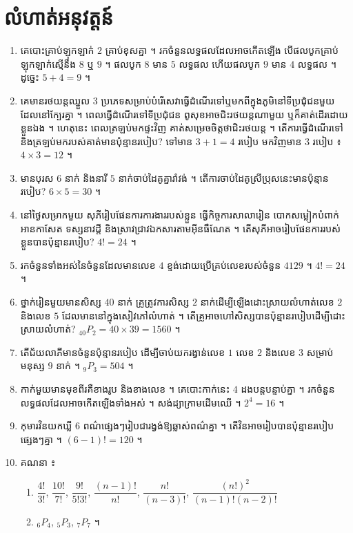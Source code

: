 \section*{លំហាត់អនុវត្តន៍}
\begin{enumerate}[1]
  \item គេបោះគ្រាប់ឡុកឡាក់ $2$ គ្រាប់ខុសគ្នា ។ រកចំនួនលទ្ធផលដែលអាចកើតឡើង បើផលបូកគ្រាប់ឡុកឡាក់ស្មើនឹង $8$ ឬ $9$ ។
  \ans
  ផលបូក $8$ មាន $5$ លទ្ធផល ហើយផលបូក $9$ មាន $4$ លទ្ធផល ។ ដូច្នេះ $5 + 4 = 9$ ។
  \item គេមានរថយន្តឈ្នួល $3$ ប្រភេទសម្រាប់បំរើសេវាធ្វើដំណើរទៅឬមកពីក្នុងភូមិនៅទីប្រជុំជនមួយដែលនៅក្បែរគ្នា ។ ពេលធ្វើដំណើរទៅទីប្រជុំជន ពូសុខអាចជិះរថយន្តណាមួយ ឬក៏គាត់ដើរដោយខ្លួនឯង ។ ហេតុនេះ ពេលត្រឡប់មកផ្ទះវិញ គាត់សម្រេចចិត្តថាជិះរថយន្ត ។ តើការធ្វើដំណើរទៅនិងត្រឡប់មករបស់គាត់មានប៉ុន្មានរបៀប?
  \ans
  ទៅមាន $3 + 1 = 4$ របៀប មកវិញមាន $3$ របៀប ៖ $4\times 3 = 12$ ។
  \item មានបុរស $6$ នាក់ និងនារី $5$ នាក់ចាប់ដៃគូគ្នារាំវង់ ។ តើការចាប់ដៃគូស្រីប្រុសនេះមានប៉ុន្មានរបៀប?
  \ans
  $6\times 5 = 30$ ។
  \item នៅថ្ងៃសម្រាកមួយ សុភីរៀបផែនការការងាររបស់ខ្លួន ធ្វើកិច្ចការសាលារៀន បោកសម្លៀកបំពាក់ អានកាសែត ទស្សនាវដ្ដី និងស្រាវជ្រាវឯកសារតាមអ៊ីនធឺណែត ។ តើសុភីអាចរៀបផែនការរបស់ខ្លួនបានប៉ុន្មានរបៀប?
  \ans
  $4! = 24$ ។
  \item រកចំនួនទាំងអស់នៃចំនួនដែលមានលេខ $4$ ខ្ទង់ដោយប្រើគ្រប់លេខរបស់ចំនួន $4129$ ។
  \ans
  $4! = 24$ ។
  \item ថ្នាក់រៀនមួយមានសិស្ស $40$ នាក់ គ្រូត្រូវការសិស្ស $2$ នាក់ដើម្បីឡើងដោះស្រាយលំហាត់លេខ $2$ និងលេខ $5$ ដែលមាននៅក្នុងសៀវភៅលំហាត់ ។ តើគ្រូអាចហៅសិស្សបានប៉ុន្មានរបៀបដើម្បីដោះស្រាយលំហាត់?
  \ans
  ${}_{40}P_2 = 40\times 39 = 1560$ ។
  \item តើជ័យលាភីមានចំនួនប៉ុន្មានរបៀប ដើម្បីចាប់យករង្វាន់លេខ $1$ លេខ $2$ និងលេខ $3$ សម្រាប់មនុស្ស $9$ នាក់ ។
  \ans
  ${}_9P_3 = 504$ ។
  \item កាក់មួយមានមុខពីរគឺខាងរូប និងខាងលេខ ។ គេបោះកាក់នេះ $4$ ដងបន្តបន្ទាប់គ្នា ។ រកចំនួនលទ្ធផលដែលអាចកើតឡើងទាំងអស់ ។ សង់ដ្យាក្រាមដើមឈើ ។
  \ans
  $2^4 = 16$ ។
  \item កុមារវិនយកឃ្លី $6$ ពណ៌ផ្សេងៗរៀបជារង្វង់ឱ្យឆ្លាស់ពណ៌គ្នា ។ តើវិនអាចរៀបបានប៉ុន្មានរបៀបផ្សេងៗគ្នា ។
  \ans
  $(6 - 1)! = 120$ ។
  \item គណនា ៖
  \begin{enumerate}[a]
    \item $\dfrac{4!}{3!}$, $\dfrac{10!}{7!}$, $\dfrac{9!}{5!3!}$, $\dfrac{(n - 1)!}{n!}$, $\dfrac{n!}{(n - 3)!}$, $\dfrac{(n!)^2}{(n - 1)!(n - 2)!}$
    \item ${}_6P_4$, ${}_5P_3$, ${}_7P_7$ ។

\end{enumerate}
\end{enumerate}
